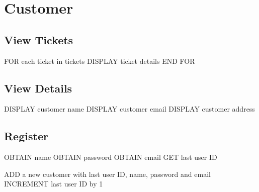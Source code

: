 \section{Customer}

\subsection{View Tickets}
\begin{pc}
FOR each ticket in tickets
	DISPLAY ticket details
END FOR
\end{pc}

\subsection{View Details}
\begin{pc}
DISPLAY customer name
DISPLAY customer email
DISPLAY customer address
\end{pc}

\subsection{Register}
\begin{pc}
OBTAIN name
OBTAIN password
OBTAIN email
GET last user ID

ADD a new customer with last user ID, name, password and email
INCREMENT last user ID by 1
\end{pc}


